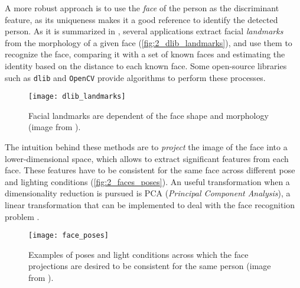 A more robust approach is to use the \textit{face} of the person as the discriminant feature, as its uniqueness makes it a good reference to identify the detected person. As it is summarized in \cite{dlib_review}, several applications extract facial \textit{landmarks} from the morphology of a given face (\autoref{fig:2_dlib_landmarks}), and use them to recognize the face, comparing it with a set of known faces and estimating the identity based on the distance to each known face. Some open-source libraries such as \texttt{dlib} and \texttt{OpenCV} provide algorithms to perform these processes.\\

\begin{figure}[h]
	\centering
	\texttt{[image: dlib\_landmarks]}
	\caption{Facial landmarks are dependent of the face shape and morphology (image from \cite{dlib_review}).}
	\label{fig:2_dlib_landmarks}
\end{figure}


The intuition behind these methods are to \textit{project} the image of the face into a lower-dimensional space, which allows to extract significant features from each face. These features have to be consistent for the same face across different pose and lighting conditions (\autoref{fig:2_faces_poses}). An useful transformation when a dimensionality reduction is pursued is PCA (\textit{Principal Component Analysis}), a linear transformation that can be implemented to deal with the face recognition problem \cite{face_pca}.

\begin{figure}[h]
	\centering
	\texttt{[image: face\_poses]}
	\caption{Examples of poses and light conditions across which the face projections are desired to be consistent for the same person (image from \cite{facenet}).}
	\label{fig:2_faces_poses}
\end{figure}
\vspace{4cm}
